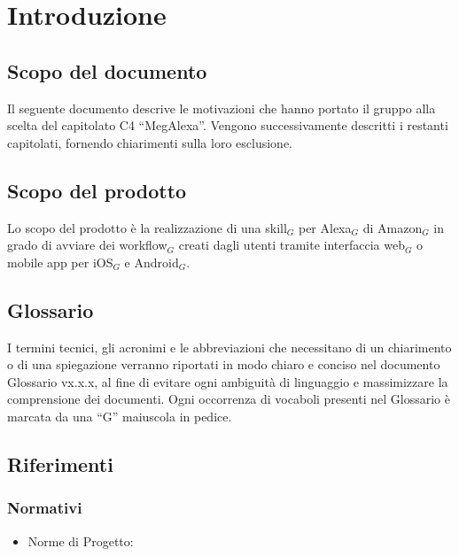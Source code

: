 \chapter{Introduzione}
\section{Scopo del documento}
Il seguente documento  descrive le motivazioni che hanno portato il gruppo alla scelta del capitolato C4 “MegAlexa”. Vengono successivamente descritti i restanti capitolati, fornendo chiarimenti sulla loro esclusione.
\section{Scopo del prodotto}
Lo scopo del prodotto è la realizzazione  di  una skill$_{G}$ per Alexa$_{G}$ di Amazon$_{G}$ in grado di avviare dei workflow$_{G}$ creati dagli utenti tramite interfaccia web$_{G}$ o mobile app per iOS$_{G}$ e Android$_{G}$. 
\section{Glossario} 

 I termini tecnici, gli acronimi e le abbreviazioni che necessitano  di un chiarimento o di una spiegazione verranno riportati in modo chiaro e conciso nel documento Glossario vx.x.x, al fine di evitare ogni ambiguità di linguaggio e massimizzare la comprensione dei documenti.
 Ogni occorrenza di vocaboli presenti nel Glossario è marcata da una “G”
 maiuscola in pedice.
 \begin{center}
 	
 \end{center}

\section{Riferimenti}
\subsection{Normativi}
\begin{itemize}
	\item Norme di Progetto: %
\end{itemize}
